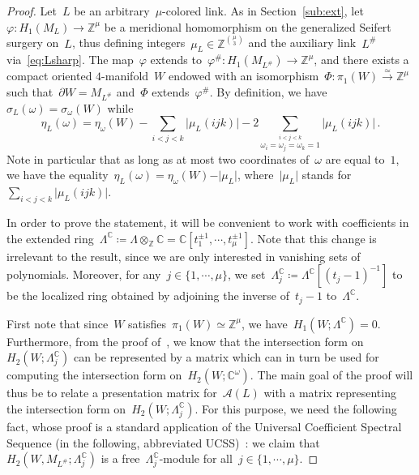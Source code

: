 \documentclass{amsart}
\newcommand{\Z}{\mathbb{Z}}
\newcommand{\C}{\mathbb{C}}
\newcommand{\A}{\mathcal{A}}
\newcommand{\LambdaC}{\Lambda^{\mathbb{C}}}
\theoremstyle{definition}
\theoremstyle{remark}
\begin{document}
	\begin{proof}
	Let~$L$ be an arbitrary~$\mu$-colored link. As in Section~\ref{sub:ext}, let~$\varphi\colon H_1(M_L)\to\Z^\mu$ be a meridional homomorphism on the generalized Seifert surgery on~$L$, thus defining integers~$\mu_L\in\Z^{\mu\choose 3}$ and the auxiliary link~$L^\#$ via~\eqref{eq:Lsharp}. The map~$\varphi$ extends
	to~$\varphi^\#\colon H_1(M_{L^\#})\to\Z^\mu$, and there exists a compact oriented $4$-manifold~$W$ endowed
	with an isomorphism~$\Phi\colon\pi_1(W)\stackrel{\simeq}{\to}\Z^\mu$ such that~$\partial W= M_{L^\#}$ and~$\Phi$ extends~$\varphi^\#$. By definition, we have~$\sigma_L(\omega)=\sigma_\omega(W)$ while
	\[
	\eta_L(\omega)=\eta_\omega(W)-\sum_{i<j<k}\vert\mu_L(ijk)\vert-2\sum_{\stackrel{i<j<k}{\omega_i=\omega_j=\omega_k=1}}\vert\mu_L(ijk)\vert\,.
	\]
	Note in particular that as long as at most two coordinates of~$\omega$ are equal to~$1$, we have the equality~$\eta_L(\omega)=\eta_\omega(W)-\vert\mu_L\vert$, where~$\vert\mu_L\vert$ stands for~$\sum_{i<j<k}\vert\mu_L(ijk)\vert$.
	
	\medskip
	
		In order to prove the statement, it will be convenient to work with coefficients in the extended ring~$\LambdaC\coloneq\Lambda\otimes_\mathbb{Z}\mathbb{C}=\mathbb{C}[t_1^{\pm 1},\cdots,t_{\mu}^{\pm 1}]$. Note that this change is irrelevant to the result, since we are only interested in vanishing sets of polynomials. Moreover, for any~$j\in\{1,\cdots,\mu\}$, we set~$\LambdaC_j\coloneq\LambdaC[(t_j-1)^{-1}]$ to be the localized ring obtained by adjoining the inverse of~$t_j-1$ to~$\LambdaC$.
	
		First note that since~$W$ satisfies~$\pi_1(W) \simeq \mathbb{Z}^{\mu}$, we have~$H_1(W;\LambdaC) = 0$. Furthermore, from the proof of~\cite[Lemma B.1]{CMP23}, we know that the intersection form on~$H_2(W;\LambdaC_j)$ can be represented by a matrix which can in turn be used for computing the intersection form on~$H_2(W;\C^\omega)$. The main goal of the proof will thus be to relate a presentation matrix for~$\A(L)$ with a matrix representing the intersection form on~$H_2(W;\LambdaC_j)$. For this purpose, we need the following fact, whose proof is a standard application of the Universal Coefficient Spectral Sequence (in the following, abbreviated UCSS)~\cite[Theorem 2.3]{Lev77}: we claim that~$H_2(W,M_{L^\#}; \LambdaC_j)$ is a free~$\LambdaC_j$-module for all~$j\in\{1,\cdots,\mu\}$.
	

\end{proof}
\end{document}
